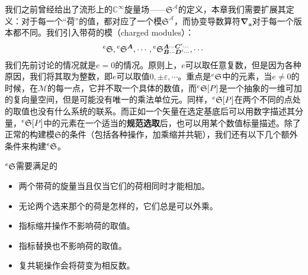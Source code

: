我们之前曾经给出了流形上的$\mathbb{C}^{\infty }$旋量场——$\mathfrak{S}^{\mathcal{A}}$的定义，本章我们需要扩展其定义：对于每一个“荷”的值，都对应了一个模$\mathfrak{S}^{\mathcal{A}}$，而协变导数算符$\boldsymbol{\nabla }_{\boldsymbol{a}}$对于每一个版本都不同。我们引入带荷的模（charged modules）：
\begin{equation*}
	\prescript{e}{}{}\mathfrak{S} ,\prescript{e}{}{}\mathfrak{S}^{\boldsymbol{A}} ,\cdots ,\prescript{e}{}{}\mathfrak{S}_{\boldsymbol{B} \cdots \boldsymbol{D} '\cdots }^{\boldsymbol{A} \cdots \boldsymbol{C} '\cdots } ,\cdots 
\end{equation*}
我们先前讨论的情况就是$e=0$的情况。原则上，$e$可以取任意复数，但是因为各种原因，我们将其取为整数，即$e$可以取值$0,\pm \varepsilon ,\cdots $。重点是$\prescript{e}{}{}\mathfrak{S}$中的元素，当$e\neq 0$的时候，在$\mathcal{M}$的每一点，它并不取一个具体的数值，而$\prescript{e}{}{}\mathfrak{S}[ P]$是一个抽象的一维可加的复向量空间，但是可能没有唯一的乘法单位元。同样，$\prescript{e}{}{}\mathfrak{S}[ P]$在两个不同的点处的取值也没有什么系统的联系。而正如一个矢量在选定基底后可以用数字描述其分量，$\prescript{e}{}{}\mathfrak{S}[ P]$中的元素在一个适当的\textbf{规范选取}后，也可以用某个数值标量描述。除了正常的构建模$\mathfrak{S}$的条件（包括各种操作，加乘缩并共轭），我们还有以下几个额外条件来构建$\prescript{e}{}{}\mathfrak{S}$。

\begin{post}[label={efraS needs}]{$\prescript{e}{}{}\mathfrak{S}$需要满足的}
	\begin{itemize}
		\item 两个带荷的旋量当且仅当它们的荷相同时才能相加。
		\item 无论两个选来那个的荷是怎样的，它们总是可以外乘。
		\item 指标缩并操作不影响荷的取值。
		\item 指标替换也不影响荷的取值。
		\item 复共轭操作会将荷变为相反数。
	\end{itemize}
\end{post}

